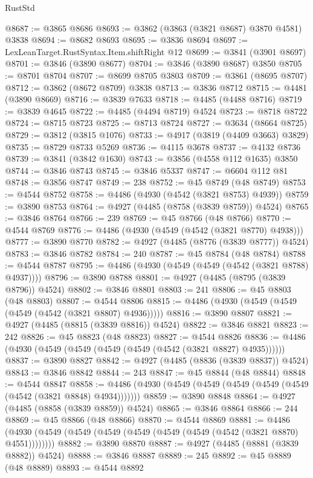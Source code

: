 \begin{lexlean}{RustStd}
\begin{coremodule}
@8687 := @3865 @8686
@8693 := @3862 (@3863 (@3821 @8687) @3870 @4581) @3838
@8694 := @8682 @8693
@8695 := @3836 @8694
@8697 := LexLeanTarget.RustSyntax.Item.shiftRight @12
@8699 := @3841 (@3901 @8697)
@8701 := @3846 (@3890 @8677)
@8704 := @3846 (@3890 @8687) @3850
@8705 := @8701 @8704
@8707 := @8699 @8705 @3803
@8709 := @3861 (@8695 @8707)
@8712 := @3862 (@8672 @8709) @3838
@8713 := @3836 @8712
@8715 := @4481 (@3890 @8669)
@8716 := @3839 @7633
@8718 := @4485 (@4488 @8716)
@8719 := @3839 @4645
@8722 := @4485 (@4494 @8719) @4524
@8723 := @8718 @8722
@8724 := @8715 @8723
@8725 := @8713 @8724
@8727 := @3634 (@8664 @8725)
@8729 := @3812 (@3815 @1076)
@8733 := @4917 (@3819 (@4409 @3663) @3829)
@8735 := @8729 @8733 @5269
@8736 := @4115 @3678
@8737 := @4132 @8736
@8739 := @3841 (@3842 @1630)
@8743 := @3856 (@4558 @112 @1635) @3850
@8744 := @3846 @8743
@8745 := @3846 @5337
@8747 := @6604 @112 @81
@8748 := @3856 @8747
@8749 := 238
@8752 := @45 @8749 (@48 @8749)
@8753 := @4544 @8752
@8758 := @4486 (@4930 (@4542 (@3821 @8753) @4939))
@8759 := @3890 @8753
@8764 := @4927 (@4485 (@8758 (@3839 @8759)) @4524)
@8765 := @3846 @8764
@8766 := 239
@8769 := @45 @8766 (@48 @8766)
@8770 := @4544 @8769
@8776 := @4486 (@4930 (@4549 (@4542 (@3821 @8770) @4938)))
@8777 := @3890 @8770
@8782 := @4927 (@4485 (@8776 (@3839 @8777)) @4524)
@8783 := @3846 @8782
@8784 := 240
@8787 := @45 @8784 (@48 @8784)
@8788 := @4544 @8787
@8795 := @4486 (@4930 (@4549 (@4549 (@4542 (@3821 @8788) @4937))))
@8796 := @3890 @8788
@8801 := @4927 (@4485 (@8795 (@3839 @8796)) @4524)
@8802 := @3846 @8801
@8803 := 241
@8806 := @45 @8803 (@48 @8803)
@8807 := @4544 @8806
@8815 := @4486 (@4930 (@4549 (@4549 (@4549 (@4542 (@3821 @8807) @4936)))))
@8816 := @3890 @8807
@8821 := @4927 (@4485 (@8815 (@3839 @8816)) @4524)
@8822 := @3846 @8821
@8823 := 242
@8826 := @45 @8823 (@48 @8823)
@8827 := @4544 @8826
@8836 := @4486 (@4930 (@4549 (@4549 (@4549 (@4549 (@4542 (@3821 @8827) @4935))))))
@8837 := @3890 @8827
@8842 := @4927 (@4485 (@8836 (@3839 @8837)) @4524)
@8843 := @3846 @8842
@8844 := 243
@8847 := @45 @8844 (@48 @8844)
@8848 := @4544 @8847
@8858 := @4486 (@4930 (@4549 (@4549 (@4549 (@4549 (@4549 (@4542 (@3821 @8848) @4934)))))))
@8859 := @3890 @8848
@8864 := @4927 (@4485 (@8858 (@3839 @8859)) @4524)
@8865 := @3846 @8864
@8866 := 244
@8869 := @45 @8866 (@48 @8866)
@8870 := @4544 @8869
@8881 := @4486 (@4930 (@4549 (@4549 (@4549 (@4549 (@4549 (@4549 (@4542 (@3821 @8870) @4551))))))))
@8882 := @3890 @8870
@8887 := @4927 (@4485 (@8881 (@3839 @8882)) @4524)
@8888 := @3846 @8887
@8889 := 245
@8892 := @45 @8889 (@48 @8889)
@8893 := @4544 @8892

\end{coremodule}
\end{lexlean}
